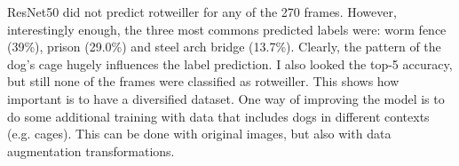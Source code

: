 \documentclass[11pt]{article}
\begin{document}
ResNet50 did not predict rotweiller for any of the 270 frames. However, interestingly enough, the three most commons predicted labels were: worm fence (39\%), prison (29.0\%) and steel arch bridge (13.7\%). Clearly, the pattern
of the dog's cage hugely influences the label prediction. I also looked the top-5 accuracy, but still none of the frames were classified as rotweiller. This shows how important is to have a diversified dataset. 
One way of improving the model is to do some additional training with data that includes dogs in different contexts (e.g. cages). This can be done with original images, but also with data augmentation transformations.
\end{document}
